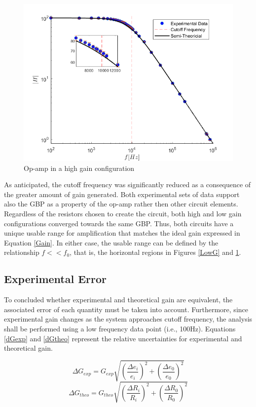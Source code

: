 \documentclass[letterpaper,12pt]{article}
\begin{document}
\begin{figure}[ht]
    \centering
    \includegraphics[scale = .6]{HighGain.png}
    \caption{Op-amp in a high gain configuration}
    \label{HighG}
\end{figure}
As anticipated, the cutoff frequency was significantly reduced as a consequence of the greater amount of gain generated. Both experimental sets of data support also the GBP as a property of the op-amp rather then other circuit elements. Regardless of the resistors chosen to create the circuit, both high and low gain configurations converged towards the same GBP. Thus, both circuits have a unique usable range for amplification that matches the ideal gain expressed in Equation \ref{Gain}. In either case, the usable range can be defined by the relationship $f<<f_0$, that is, the horizontal regions in Figures \ref{LowG} and \ref{HighG}.

\subsection{Experimental Error}
To concluded whether experimental and theoretical gain are equivalent, the associated error of each quantity must be taken into account. Furthermore, since experimental gain changes as the system approaches cutoff frequency, the analysis shall be performed using a low frequency data point (i.e., 100Hz). Equations \ref{dGexp} and \ref{dGtheo} represent the relative uncertainties for experimental and theoretical gain. 

\begin{equation}
    \Delta G_{exp} = G_{exp} \sqrt{ (\frac{\Delta e_i}{e_i})^2 + (\frac{\Delta e_0}{e_0})^2}
    \label{dGexp}
\end{equation}
\begin{equation}
    \Delta G_{theo} = G_{theo}\sqrt{(\frac{\Delta R_i}{R_i})^2 + (\frac{\Delta R_0}{R_0})^2 }
    \label{dGtheo}
\end{equation}
\end{document}
